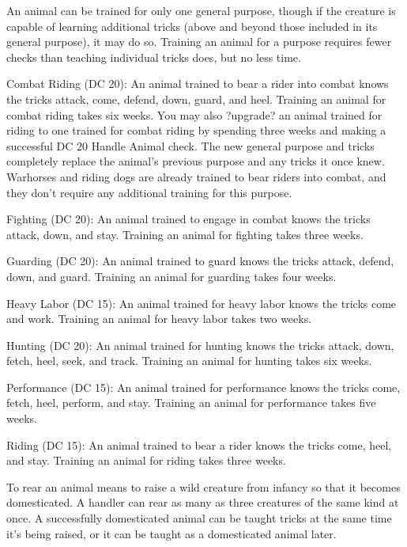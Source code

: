 An animal can be trained for only one general purpose, though if the creature is capable of learning additional tricks (above and beyond those included in its general purpose), it may do so. Training an animal for a purpose requires fewer checks than teaching individual tricks does, but no less time.

\par Combat Riding (DC 20): An animal trained to bear a rider into combat knows the tricks attack, come, defend, down, guard, and heel. Training an animal for combat riding takes six weeks. You may also ?upgrade? an animal trained for riding to one trained for combat riding by spending three weeks and making a successful DC 20 Handle Animal check. The new general purpose and tricks completely replace the animal's previous purpose and any tricks it once knew. Warhorses and riding dogs are already trained to bear riders into combat, and they don't require any additional training for this purpose.
\par Fighting (DC 20): An animal trained to engage in combat knows the tricks attack, down, and stay. Training an animal for fighting takes three weeks.
\par Guarding (DC 20): An animal trained to guard knows the tricks attack, defend, down, and guard. Training an animal for guarding takes four weeks.
\par Heavy Labor (DC 15): An animal trained for heavy labor knows the tricks come and work. Training an animal for heavy labor takes two weeks.
\par Hunting (DC 20): An animal trained for hunting knows the tricks attack, down, fetch, heel, seek, and track. Training an animal for hunting takes six weeks.
\par Performance (DC 15): An animal trained for performance knows the tricks come, fetch, heel, perform, and stay. Training an animal for performance takes five weeks.
\par Riding (DC 15): An animal trained to bear a rider knows the tricks come, heel, and stay. Training an animal for riding takes three weeks.

 To rear an animal means to raise a wild creature from infancy so that it becomes domesticated. A handler can rear as many as three creatures of the same kind at once. A successfully domesticated animal can be taught tricks at the same time it's being raised, or it can be taught as a domesticated animal later.

